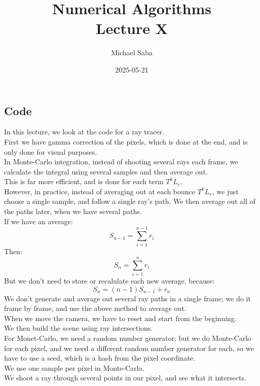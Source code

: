 \documentclass[12pt]{article}
\title{%
    \Huge Numerical Algorithms \\
    \Large Lecture X
}
\date{2025-05-21}
\author{Michael Saba}
\begin{document}
\maketitle
\newpage
\setlength{\parindent}{0pt}

\subsection*{Code}

In this lecture, we look at the code
for a ray tracer. \\

First we have gamma correction of the pixels,
which is done at the end, and is only done
for visual purposes. \\

In Monte-Carlo integration, instead
of shooting several rays each
frame, we calculate the integral
using several samples and then average out. \\
This is far more efficient, and is done
for each term $T^kL_e$. \\

However, in practice,
instead of averaging out at each
bounce $T^kL_e$, we just choose a single sample,
and follow a single ray's path.
We then average out all of the paths
later, when we have several paths. \\

If we have an average:
\[ S_{n-1} = \sum_{i = 1}^{n-1} r_{i} \]
Then:
\[ S_{n} = \sum_{i = 1}^{n} r_{i} \]
But we don't need to store or recalulate
each new average, because:
\[ S_{n} = (n-1)S_{n-1} + r_n \]
We don't generate and average out several
ray paths in a single frame; we do it
frame by frame, and use the above method to
average out. \\
When we move the camera, we have to reset
and start from the beginning. \\

We then build the scene using ray intersections. \\

For Monet-Carlo, we need a random number generator;
but we do Monte-Carlo for each pixel,
and we need a different random number generator
for each, so we have to use a seed,
which is a hash from the pixel coordinate. \\

We use one sample per pixel in Monte-Carlo. \\

We shoot a ray through several points in our
pixel, and see what it intersects. \\
\end{document}
